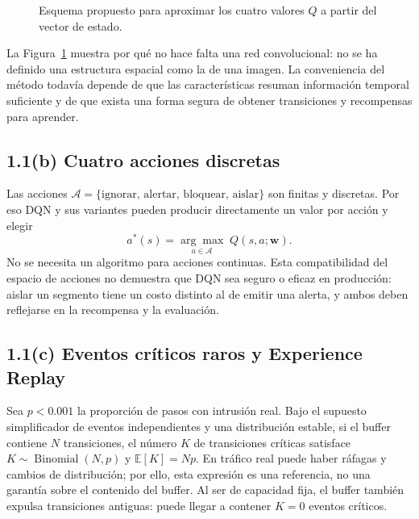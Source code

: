 \documentclass[11pt,a4paper]{article}
\begin{document}
\begin{figure}[htbp]
\centering
{}
\caption{Esquema propuesto para aproximar los cuatro valores $Q$ a partir del vector de estado.}
\label{fig:red}
\end{figure}

La Figura~\ref{fig:red} muestra por qué no hace falta una red convolucional: no se ha definido una estructura espacial como la de una imagen. La conveniencia del método todavía depende de que las características resuman información temporal suficiente y de que exista una forma segura de obtener transiciones y recompensas para aprender.

\subsection*{1.1(b) Cuatro acciones discretas}
Las acciones $\mathcal A=\{\text{ignorar, alertar, bloquear, aislar}\}$ son finitas y discretas. Por eso DQN y sus variantes pueden producir directamente un valor por acción y elegir
\begin{equation}
 a^*(s)=\underset{a\in\mathcal A}{\arg\max}\;Q(s,a;\mathbf{w}).
\end{equation}
No se necesita un algoritmo para acciones continuas. Esta compatibilidad del espacio de acciones no demuestra que DQN sea seguro o eficaz en producción: aislar un segmento tiene un costo distinto al de emitir una alerta, y ambos deben reflejarse en la recompensa y la evaluación.

\subsection*{1.1(c) Eventos críticos raros y Experience Replay}
Sea $p<0.001$ la proporción de pasos con intrusión real. Bajo el supuesto simplificador de eventos independientes y una distribución estable, si el buffer contiene $N$ transiciones, el número $K$ de transiciones críticas satisface $K\sim\operatorname{Binomial}(N,p)$ y $\mathbb E[K]=Np$. En tráfico real puede haber ráfagas y cambios de distribución; por ello, esta expresión es una referencia, no una garantía sobre el contenido del buffer. Al ser de capacidad fija, el buffer también expulsa transiciones antiguas: puede llegar a contener $K=0$ eventos críticos.
\end{document}

